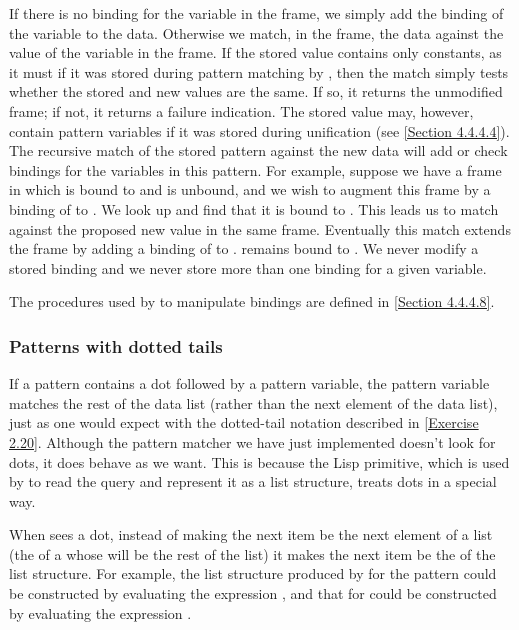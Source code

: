 If there is no binding for the variable in the frame, we simply add the binding of the variable to the data.
Otherwise we match, in the frame, the data against the value of the variable in the frame.
If the stored value contains only constants, as it must if it was stored during pattern matching by , then the match simply tests whether the stored and new values are the same.
If so, it returns the unmodified frame;
if not, it returns a failure indication.
The stored value may, however, contain pattern variables if it was stored during unification (see \cref{Section 4.4.4.4}).
The recursive match of the stored pattern against the new data will add or check bindings for the variables in this pattern.
For example, suppose we have a frame in which  is bound to  and  is unbound, and we wish to augment this frame by a binding of  to .
We look up  and find that it is bound to .
This leads us to match  against the proposed new value  in the same frame.
Eventually this match extends the frame by adding a binding of  to .
 remains bound to .
We never modify a stored binding and we never store more than one binding for a given variable.

The procedures used by  to manipulate bindings are defined in \cref{Section 4.4.4.8}.



\subsubsection*{Patterns with dotted tails}

If a pattern contains a dot followed by a pattern variable, the pattern variable matches the rest of the data list (rather than the next element of the data list), just as one would expect with the dotted-tail notation described in \cref{Exercise 2.20}.
Although the pattern matcher we have just implemented doesn’t look for dots, it does behave as we want.
This is because the Lisp  primitive, which is used by  to read the query and represent it as a list structure, treats dots in a special way.

When  sees a dot, instead of making the next item be the next element of a list (the  of a  whose  will be the rest of the list) it makes the next item be the  of the list structure.
For example, the list structure produced by  for the pattern  could be constructed by evaluating the expression , and that for  could be constructed by evaluating the expression .

